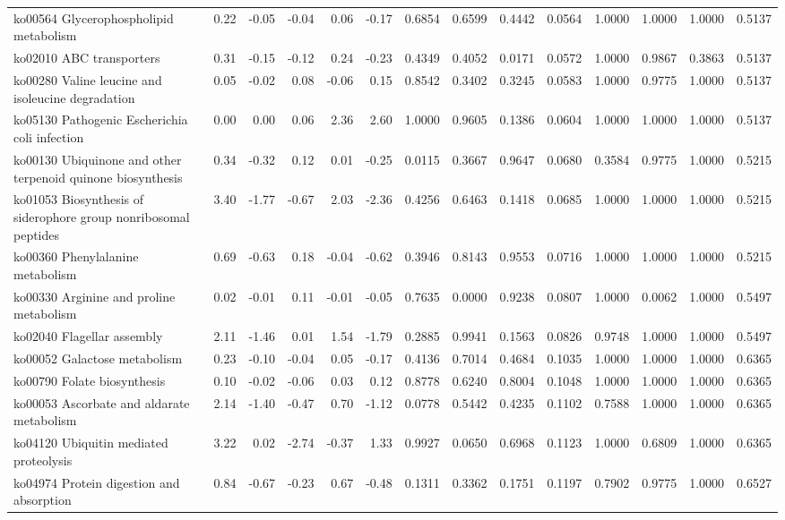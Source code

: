{\begin{landscape}
\begin{longtable}{ | l | r | r | r | r | r | r  | r | r | r | r | r | r  | r  |}
			ko00564  Glycerophospholipid metabolism & 0.22 & -0.05 & -0.04 & 0.06 & -0.17 & 0.6854 & 0.6599 & 0.4442 & 0.0564 & 1.0000 & 1.0000 & 1.0000 & 0.5137 \\ 
			ko02010  ABC transporters & 0.31 & -0.15 & -0.12 & 0.24 & -0.23 & 0.4349 & 0.4052 & 0.0171 & 0.0572 & 1.0000 & 0.9867 & 0.3863 & 0.5137 \\ 
			ko00280  Valine leucine and isoleucine degradation & 0.05 & -0.02 & 0.08 & -0.06 & 0.15 & 0.8542 & 0.3402 & 0.3245 & 0.0583 & 1.0000 & 0.9775 & 1.0000 & 0.5137 \\ 
			ko05130  Pathogenic Escherichia coli infection & 0.00 & 0.00 & 0.06 & 2.36 & 2.60 & 1.0000 & 0.9605 & 0.1386 & 0.0604 & 1.0000 & 1.0000 & 1.0000 & 0.5137 \\ 
			ko00130  Ubiquinone and other terpenoid quinone biosynthesis & 0.34 & -0.32 & 0.12 & 0.01 & -0.25 & 0.0115 & 0.3667 & 0.9647 & 0.0680 & 0.3584 & 0.9775 & 1.0000 & 0.5215 \\ 
			ko01053  Biosynthesis of siderophore group nonribosomal peptides & 3.40 & -1.77 & -0.67 & 2.03 & -2.36 & 0.4256 & 0.6463 & 0.1418 & 0.0685 & 1.0000 & 1.0000 & 1.0000 & 0.5215 \\ 
			ko00360  Phenylalanine metabolism & 0.69 & -0.63 & 0.18 & -0.04 & -0.62 & 0.3946 & 0.8143 & 0.9553 & 0.0716 & 1.0000 & 1.0000 & 1.0000 & 0.5215 \\ 
			ko00330  Arginine and proline metabolism & 0.02 & -0.01 & 0.11 & -0.01 & -0.05 & 0.7635 & 0.0000 & 0.9238 & 0.0807 & 1.0000 & 0.0062 & 1.0000 & 0.5497 \\ 
			ko02040  Flagellar assembly & 2.11 & -1.46 & 0.01 & 1.54 & -1.79 & 0.2885 & 0.9941 & 0.1563 & 0.0826 & 0.9748 & 1.0000 & 1.0000 & 0.5497 \\ 
			ko00052  Galactose metabolism & 0.23 & -0.10 & -0.04 & 0.05 & -0.17 & 0.4136 & 0.7014 & 0.4684 & 0.1035 & 1.0000 & 1.0000 & 1.0000 & 0.6365 \\ 
			ko00790  Folate biosynthesis & 0.10 & -0.02 & -0.06 & 0.03 & 0.12 & 0.8778 & 0.6240 & 0.8004 & 0.1048 & 1.0000 & 1.0000 & 1.0000 & 0.6365 \\ 
			ko00053  Ascorbate and aldarate metabolism & 2.14 & -1.40 & -0.47 & 0.70 & -1.12 & 0.0778 & 0.5442 & 0.4235 & 0.1102 & 0.7588 & 1.0000 & 1.0000 & 0.6365 \\ 
			ko04120  Ubiquitin mediated proteolysis & 3.22 & 0.02 & -2.74 & -0.37 & 1.33 & 0.9927 & 0.0650 & 0.6968 & 0.1123 & 1.0000 & 0.6809 & 1.0000 & 0.6365 \\ 
			ko04974  Protein digestion and absorption & 0.84 & -0.67 & -0.23 & 0.67 & -0.48 & 0.1311 & 0.3362 & 0.1751 & 0.1197 & 0.7902 & 0.9775 & 1.0000 & 0.6527 \\ 

\end{longtable}
\end{landscape}}
